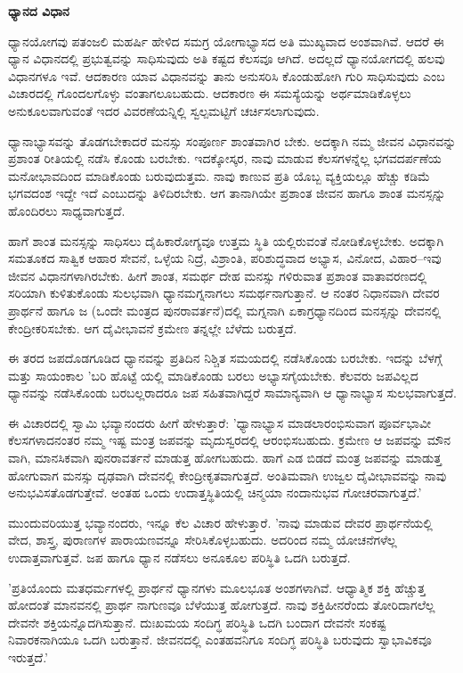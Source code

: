 \textbf{ಧ್ಯಾನದ ವಿಧಾನ}

ಧ್ಯಾನಯೋಗವು ಪತಂಜಲಿ ಮಹರ್ಷಿ ಹೇಳಿದ ಸಮಗ್ರ ಯೋಗಾಭ್ಯಾಸದ ಅತಿ ಮುಖ್ಯವಾದ ಅಂಶವಾಗಿವೆ. ಆದರೆ ಈ ಧ್ಯಾನ ವಿಧಾನದಲ್ಲಿ ಪ್ರಭುತ್ವವನ್ನು ಸಾಧಿಸುವುದು ಅತಿ ಕಷ್ಟದ ಕೆಲಸವೂ ಆಗಿದೆ. ಅದಲ್ಲದೆ ಧ್ಯಾನಯೋಗದಲ್ಲಿ ಹಲವು ವಿಧಾನಗಳೂ ಇವೆ. ಆದಕಾರಣ ಯಾವ ವಿಧಾನವನ್ನು ತಾನು ಅನುಸರಿಸಿ ಕೊಂಡುಹೋಗಿ ಗುರಿ ಸಾಧಿಸುವುದು ಎಂಬ ವಿಚಾರದಲ್ಲಿ ಗೊಂದಲಗೊಳ್ಳು ವಂತಾಗಲೂಬಹುದು. ಆದಕಾರಣ ಈ ಸಮಸ್ಯೆಯನ್ನು ಅರ್ಥಮಾಡಿಕೊಳ್ಳಲು ಅನುಕೂಲವಾಗುವಂತೆ ಇದರ ವಿವರಣೆಯನ್ನಿಲ್ಲಿ ಸ್ವಲ್ಪಮಟ್ಟಿಗೆ ಚರ್ಚಿಸಲಾಗುವುದು.

ಧ್ಯಾನಾಭ್ಯಾಸವನ್ನು ತೊಡಗಬೇಕಾದರೆ ಮನಸ್ಸು ಸಂಪೂರ್ಣ ಶಾಂತವಾಗಿರ ಬೇಕು. ಅದಕ್ಕಾಗಿ ನಮ್ಮ ಜೀವನ ವಿಧಾನವನ್ನು ಪ್ರಶಾಂತ ರೀತಿಯಲ್ಲಿ ನಡೆಸಿ ಕೊಂಡು ಬರಬೇಕು. ಇದಕ್ಕೋಸ್ಕರ, ನಾವು ಮಾಡುವ ಕೆಲಸಗಳನ್ನೆಲ್ಲ ಭಗವದರ್ಪಣೆಯ ಮನೋಭಾವದಿಂದ ಮಾಡಿಕೊಂಡು ಬರುವುದುತ್ತಮ. ನಾವು ಕಾಣುವ ಪ್ರತಿ ಯೊಬ್ಬ ವ್ಯಕ್ತಿಯಲ್ಲೂ ಹೆಚ್ಚು ಕಡಿಮೆ ಭಗವದಂಶ ಇದ್ದೇ ಇದೆ ಎಂಬುದನ್ನು ತಿಳಿದಿರಬೇಕು. ಆಗ ತಾನಾಗಿಯೇ ಪ್ರಶಾಂತ ಜೀವನ ಹಾಗೂ ಶಾಂತ ಮನಸ್ಸನ್ನು ಹೊಂದಿರಲು ಸಾಧ್ಯವಾಗುತ್ತದೆ.

ಹಾಗೆ ಶಾಂತ ಮನಸ್ಸನ್ನು ಸಾಧಿಸಲು ದೈಹಿಕಾರೋಗ್ಯವೂ ಉತ್ತಮ ಸ್ಥಿತಿ ಯಲ್ಲಿರುವಂತೆ ನೋಡಿಕೊಳ್ಳಬೇಕು. ಅದಕ್ಕಾಗಿ ಸಮತೂಕದ ಸಾತ್ವಿಕ ಆಹಾರ ಸೇವನೆ, ಒಳ್ಳೆಯ ನಿದ್ರೆ, ವಿಶ್ರಾಂತಿ, ಪರಿಶುದ್ಧವಾದ ಅಭ್ಯಾಸ, ವಿನೋದ, ವಿಹಾರ–ಇವು ಜೀವನ ವಿಧಾನಗಳಾಗಿರಬೇಕು. ಹೀಗೆ ಶಾಂತ, ಸಮರ್ಥ ದೇಹ ಮನಸ್ಸು ಗಳಿರುವಾತ ಪ್ರಶಾಂತ ವಾತಾವರಣದಲ್ಲಿ ಸರಿಯಾಗಿ ಕುಳಿತುಕೊಂಡು ಸುಲಭವಾಗಿ ಧ್ಯಾನಮಗ್ನನಾಗಲು ಸಮರ್ಥನಾಗುತ್ತಾನೆ. ಆ ನಂತರ ನಿಧಾನವಾಗಿ ದೇವರ ಪ್ರಾರ್ಥನೆ ಹಾಗೂ ಜ (ಒಂದೇ ಮಂತ್ರದ ಪುನರಾವರ್ತನೆ)ದಲ್ಲಿ ಮಗ್ನನಾಗಿ ಏಕಾಗ್ರಧ್ಯಾನದಿಂದ ಮನಸ್ಸನ್ನು ದೇವನಲ್ಲಿ ಕೇಂದ್ರೀಕರಿಸಬೇಕು. ಆಗ ದೈವೀಭಾವನೆ ಕ್ರಮೇಣ ತನ್ನಲ್ಲೇ ಬೆಳೆದು ಬರುತ್ತದೆ.

ಈ ತರದ ಜಪದೊಡಗೂಡಿದ ಧ್ಯಾನವನ್ನು ಪ್ರತಿದಿನ ನಿಶ್ಚಿತ ಸಮಯದಲ್ಲಿ ನಡೆಸಿಕೊಂಡು ಬರಬೇಕು. ಇದನ್ನು ಬೆಳಗ್ಗೆ ಮತ್ತು ಸಾಯಂಕಾಲ 'ಬರಿ ಹೊಟ್ಟೆ ಯಲ್ಲಿ ಮಾಡಿಕೊಂಡು ಬರಲು ಅಭ್ಯಾಸಗೈಯಬೇಕು. ಕೆಲವರು ಜಪವಿಲ್ಲದ ಧ್ಯಾನವನ್ನು ನಡೆಸಿಕೊಂಡು ಬರಬಲ್ಲರಾದರೂ ಜಪ ಸಹಿತವಾಗಿದ್ದರೆ ಸಾಮಾನ್ಯವಾಗಿ ಆ ಧ್ಯಾನಾಭ್ಯಾಸ ಸುಲಭವಾಗುತ್ತದೆ.

ಈ ವಿಚಾರದಲ್ಲಿ ಸ್ವಾಮಿ ಭವ್ಯಾನಂದರು ಹೀಗೆ ಹೇಳುತ್ತಾರೆ: 'ಧ್ಯಾನಾಭ್ಯಾಸ ಮಾಡಲಾರಂಭಿಸುವಾಗ ಪೂರ್ವಭಾವೀ ಕೆಲಸಗಳಾದನಂತರ ನಮ್ಮ ಇಷ್ಟ ಮಂತ್ರ ಜಪವನ್ನು ಮೃದುಸ್ವರದಲ್ಲಿ ಆರಂಭಿಸಬಹುದು. ಕ್ರಮೇಣ ಆ ಜಪವನ್ನು ಮೌನ ವಾಗಿ, ಮಾನಸಿಕವಾಗಿ ಪುನರಾವರ್ತನೆ ಮಾಡುತ್ತ ಹೋಗಬಹುದು. ಹಾಗೆ ಎಡ ಬಿಡದೆ ಮಂತ್ರ ಜಪವನ್ನು ಮಾಡುತ್ತ ಹೋಗುವಾಗ ಮನಸ್ಸು ದೃಢವಾಗಿ ದೇವನಲ್ಲಿ ಕೇಂದ್ರೀಕೃತವಾಗುತ್ತದೆ. ಅಂತಿಮವಾಗಿ ಉಜ್ವಲ ದೈವೀಭಾವವನ್ನು ನಾವು ಅನುಭವಿಸತೊಡಗುತ್ತೇವೆ. ಅಂತಹ ಒಂದು ಉದಾತ್ತಸ್ಥಿತಿಯಲ್ಲಿ ಚಿನ್ಮಯಾ ನಂದಾನುಭವ ಗೋಚರವಾಗುತ್ತದೆ.'

ಮುಂದುವರಿಯುತ್ತ ಭವ್ಯಾನಂದರು, ಇನ್ನೂ ಕೆಲ ವಿಚಾರ ಹೇಳುತ್ತಾರೆ. 'ನಾವು ಮಾಡುವ ದೇವರ ಪ್ರಾರ್ಥನೆಯಲ್ಲಿ ವೇದ, ಶಾಸ್ತ್ರ, ಪುರಾಣಗಳ ಪಾರಾಯಣವನ್ನೂ ಸೇರಿಸಿಕೊಳ್ಳಬಹುದು. ಅದರಿಂದ ನಮ್ಮ ಯೋಚನೆಗಳೆಲ್ಲ ಉದಾತ್ತವಾಗುತ್ತವೆ. ಜಪ ಹಾಗೂ ಧ್ಯಾನ ನಡೆಸಲು ಅನೂಕೂಲ ಪರಿಸ್ಥಿತಿ ಒದಗಿ ಬರುತ್ತದೆ.

'ಪ್ರತಿಯೊಂದು ಮತಧರ್ಮಗಳಲ್ಲಿ ಪ್ರಾರ್ಥನೆ ಧ್ಯಾನಗಳು ಮೂಲಭೂತ ಅಂಶಗಳಾಗಿವೆ. ಆಧ್ಯಾತ್ಮಿಕ ಶಕ್ತಿ ಹೆಚ್ಚುತ್ತ ಹೋದಂತೆ ಮಾನವನಲ್ಲಿ ಪ್ರಾರ್ಥ ನಾಗುಣವೂ ಬೆಳೆಯುತ್ತ ಹೋಗುತ್ತದೆ. ನಾವು ಶಕ್ತಿಹೀನರೆಂದು ತೋರಿದಾಗಲೆಲ್ಲ ದೇವನೇ ಶಕ್ತಿಯನ್ನೊದಗಿಸುತ್ತಾನೆ. ದುಃಖಮಯ ಸಂದಿಗ್ಧ ಪರಿಸ್ಥಿತಿ ಒದಗಿ ಬಂದಾಗ ದೇವನೇ ಸಂಕಷ್ಟ ನಿವಾರಕನಾಗಿಯೂ ಒದಗಿ ಬರುತ್ತಾನೆ. ಜೀವನದಲ್ಲಿ ಎಂತಹವನಿಗೂ ಸಂದಿಗ್ಧ ಪರಿಸ್ಥಿತಿ ಬರುವುದು ಸ್ವಾಭಾವಿಕವೂ ಇರುತ್ತದೆ.'

